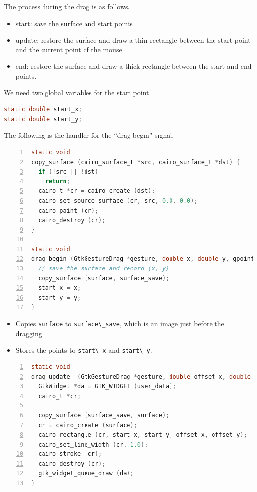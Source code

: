 The process during the drag is as follows.

\begin{itemize}
\tightlist
\item
  start: save the surface and start points
\item
  update: restore the surface and draw a thin rectangle between the
  start point and the current point of the mouse
\item
  end: restore the surface and draw a thick rectangle between the start
  and end points.
\end{itemize}

We need two global variables for the start point.

\begin{lstlisting}[language=C]
static double start_x;
static double start_y;
\end{lstlisting}

The following is the handler for the ``drag-begin'' signal.

\begin{lstlisting}[language=C, numbers=left]
static void
copy_surface (cairo_surface_t *src, cairo_surface_t *dst) {
  if (!src || !dst)
    return;
  cairo_t *cr = cairo_create (dst);
  cairo_set_source_surface (cr, src, 0.0, 0.0);
  cairo_paint (cr);
  cairo_destroy (cr);
}

static void
drag_begin (GtkGestureDrag *gesture, double x, double y, gpointer user_data) {
  // save the surface and record (x, y)
  copy_surface (surface, surface_save);
  start_x = x;
  start_y = y;
}
\end{lstlisting}

\begin{itemize}
\tightlist
\item
  Copies \passthrough{\lstinline!surface!} to
  \passthrough{\lstinline!surface\_save!}, which is an image just before
  the dragging.
\item
  Stores the points to \passthrough{\lstinline!start\_x!} and
  \passthrough{\lstinline!start\_y!}.
\end{itemize}

\begin{lstlisting}[language=C, numbers=left]
static void
drag_update  (GtkGestureDrag *gesture, double offset_x, double offset_y, gpointer user_data) {
  GtkWidget *da = GTK_WIDGET (user_data);
  cairo_t *cr;
  
  copy_surface (surface_save, surface);
  cr = cairo_create (surface);
  cairo_rectangle (cr, start_x, start_y, offset_x, offset_y);
  cairo_set_line_width (cr, 1.0);
  cairo_stroke (cr);
  cairo_destroy (cr);
  gtk_widget_queue_draw (da);
}
\end{lstlisting}


